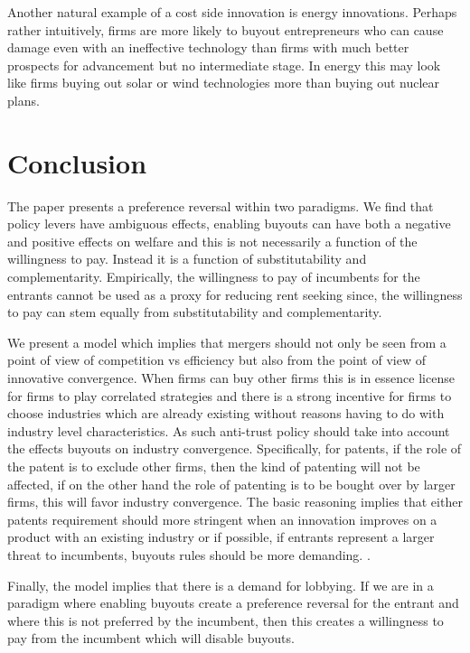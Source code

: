 Another natural example of a cost side innovation is energy innovations. Perhaps rather intuitively, firms are more likely to buyout entrepreneurs who can cause damage even with an ineffective technology than firms with much better prospects for advancement but no intermediate stage. In energy this may look like firms buying out solar or wind technologies more than buying out nuclear plans.   



\section{Conclusion}


The paper presents a preference reversal within two paradigms. We find that policy levers have ambiguous effects, enabling buyouts can have both a negative and positive effects on welfare and this is not necessarily a function of the willingness to pay. Instead it is a function of substitutability and complementarity. Empirically, the willingness to pay of incumbents for the entrants cannot be used as a proxy for reducing rent seeking since, the willingness to pay can stem equally from substitutability and complementarity. 

We present a model which implies that mergers should not only be seen from a point of view of competition vs efficiency but also from the point of view of innovative convergence. When firms can buy other firms this is in essence license for firms to play correlated strategies and there is a strong incentive for firms to choose industries which are already existing without reasons having to do with industry level characteristics. As such anti-trust policy should take into account the effects buyouts on industry convergence. Specifically, for patents, if the role of the patent is to exclude other firms, then the kind of patenting will not be affected, if on the other hand the role of patenting is to be bought over by larger firms, this will favor industry convergence. The basic reasoning implies that either patents requirement should more stringent when an innovation improves on a product with an existing industry or if possible, if entrants represent a larger threat to incumbents, buyouts rules should be more demanding. . 

Finally, the model implies that there is a demand for lobbying. If we are in a paradigm where enabling buyouts create a preference reversal for the entrant and where this is not preferred by the incumbent, then this creates a willingness to pay from the incumbent which will disable buyouts. 


